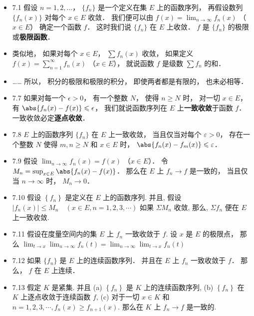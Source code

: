 \begin{itemize}
\item 7.1 假设 $n=1,2,...$， $\{f_n\}$ 是一个定义在集 $E$ 上的函数序列， 再假设数列 $\{f_n(x)\}$ 对每个 $x\in E$ 收敛． 我们便可以由 $f(x) = \lim_{n\to\infty} f_n(x)$ （$x\in E$） 确定一个函数 $f$． 这时我们说 $\{f_n\}$ 在 $E$ 上收敛． $f$ 是 $\{f_n\}$ 的极限或\textbf{极限函数}．

\item 类似地， 如果对每个 $x\in E$， $\sum f_n(x)$ 收敛， 如果定义 $f(x) = \sum_{n=1}^\infty f_n(x)$ （$x\in E$）， 就说函数 $f$ 是级数 $\sum f_n$ 的和．

\item …… 所以， 积分的极限和极限的积分， 即使两者都是有限的， 也未必相等．

\item 7.7 如果对每一个 $\epsilon >0$， 有一个整数 $N$， 使得 $n\geqslant N$ 时， 对一切 $x\in E$， 有 $\abs{f_n(x)-f(x)} \leqslant \epsilon$， 我们就说函数序列在 $E$ 上\textbf{一致收敛}于函数 $f$． 一致收敛必定\textbf{逐点收敛}．

\item 7.8 $E$ 上的函数序列 $\{f_n\}$ 在 $E$ 上一致收敛， 当且仅当对每个 $\varepsilon>0$， 存在一个整数 $N$ 使得 $m,n\geqslant N$ 和 $x\in E$ 时， $\abs{f_n(x)-f_m(x)}\leqslant \varepsilon$．

\item 7.9 假设 $\lim_{n\to\infty} f_n(x) = f(x)$ （$x\in E$）． 令 $M_n = \sup_{x\in E} \abs{f_n(x)-f(x)}$． 那么在 $E$ 上 $f_n\to f$ 是一致的， 当且仅当 $n\to \infty$ 时， $M_n\to 0$．

\item 7.10 假设 $\left\{f_{n}\right\}$ 是定义在 $E$ 上的函数序列. 并且, 假设 $\left|f_{n}(x)\right| \leqslant M_{n} \quad(x \in E, n=1,2,3, \cdots)$ 如果 $\Sigma M_{n}$ 收敛, 那么, $\Sigma f_{n}$ 便在 $E$ 上一致收敛.

\item 7.11 假设在度量空间内的集 $E$ 上 $f_{n}$ 一致收敛于 $f$. 设 $x$ 是 $E$ 的极限点， 那么 $\lim_{t\to x}\lim_{n\to\infty} f_n(t) = \lim_{n\to\infty}\lim_{t\to x} f_n(t)$

\item 7.12 如果 $\{f_n\}$ 是 $E$ 上的连续函数序列． 并且在 $E$ 上 $f_n$ 一致收敛于 $f$． 那么， $f$ 在 $E$ 上连续．

\item 7.13 假定 $K$ 是紧集. 并且 (a) $\left\{f_{n}\right\}$ 是 $K$ 上的连续函数序列, (b) $\left\{f_{n}\right\}$ 在 $K$ 上逐点收敛于连续函数 $f$, (c) 对于一切 $x \in K$ 和 $n=1,2,3, \cdots, f_{n}(x) \geqslant f_{n+1}(x)$. 那么在 $K$ 上 $f_{n} \rightarrow f$ 是一致的.


\end{itemize}
